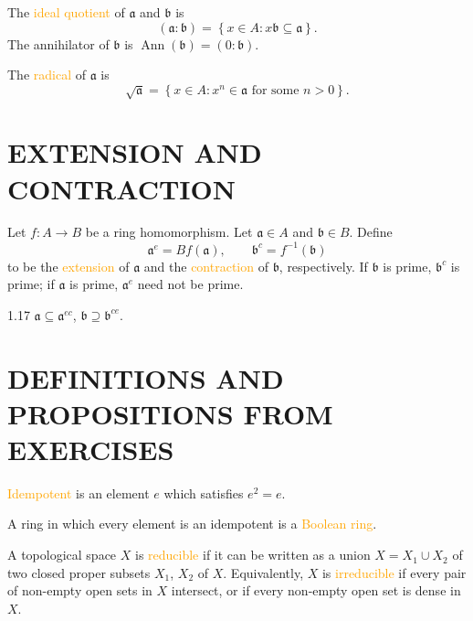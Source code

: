 The \textcolor{orange}{ideal quotient} of $\mathfrak{a}$ and $\mathfrak{b}$ is
\begin{equation*}
	(\mathfrak{a}:\mathfrak{b})=\left\{x\in A:x\mathfrak{b}\subseteq\mathfrak{a}\right\}.
\end{equation*}
The annihilator of $\mathfrak{b}$ is $\operatorname{Ann}(\mathfrak{b})=(0:\mathfrak{b})$.

The \textcolor{orange}{radical} of $\mathfrak{a}$ is
\begin{equation*}
	\sqrt{\mathfrak{a}}=\left\{x\in A:x^n\in\mathfrak{a}\text{ for some }n>0\right\}.
\end{equation*}

\section*{EXTENSION AND CONTRACTION}
Let $f:A\rightarrow B$ be a ring homomorphism. Let $\mathfrak{a}\in A$ and $\mathfrak{b}\in B$. Define
\begin{equation*}
	\mathfrak{a}^e=Bf(\mathfrak{a}),\qquad\mathfrak{b}^c=f^{-1}(\mathfrak{b})
\end{equation*}
to be the \textcolor{orange}{extension} of $\mathfrak{a}$ and the \textcolor{orange}{contraction} of $\mathfrak{b}$, respectively. If $\mathfrak{b}$ is prime, $\mathfrak{b}^c$ is prime; if $\mathfrak{a}$ is prime, $\mathfrak{a}^e$ need not be prime.

\begin{proposition}{1.17}
	$\mathfrak{a}\subseteq\mathfrak{a}^{ec}$, $\mathfrak{b}\supseteq\mathfrak{b}^{ce}$.
\end{proposition}

\section*{DEFINITIONS AND PROPOSITIONS FROM EXERCISES}

\begin{definition}
	\textcolor{orange}{Idempotent} is an element $e$ which satisfies $e^2=e$.
	
	A ring in which every element is an idempotent is a \textcolor{orange}{Boolean ring}.
\end{definition}

\begin{definition}
	A topological space $X$ is \textcolor{orange}{reducible} if it can be written as a union $X=X_1\cup X_2$ of two closed proper subsets $X_1$, $X_2$ of $X$. Equivalently, $X$ is \textcolor{orange}{irreducible} if every pair of non-empty open sets in $X$ intersect, or if every non-empty open set is dense in $X$.
\end{definition}

